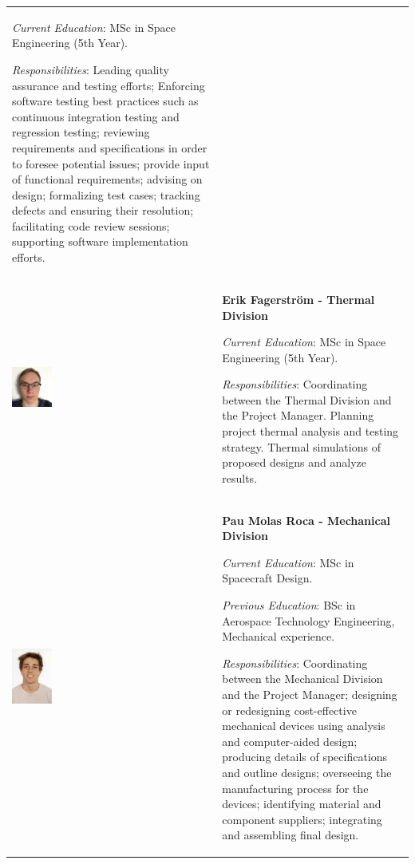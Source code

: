 \begin{longtable}[]{m{} m{}}
\smallskip
\textit{Current Education}: MSc in Space Engineering (5th Year).

\smallskip
\textit{Responsibilities}: Leading quality assurance and testing efforts; Enforcing software testing best practices such as continuous integration testing and regression testing; reviewing requirements and specifications in order to foresee potential issues; provide input of functional requirements; advising on design; formalizing test cases; tracking defects and ensuring their resolution; facilitating code review sessions; supporting software implementation efforts.     
\bigskip
\\


\includegraphics[width=0.2\textwidth]{1-introduction/img/erik-fagerstrom.jpg} & \textbf{Erik Fagerström - Thermal Division}

\smallskip
\textit{Current Education}: MSc in Space Engineering (5th Year).


\smallskip
\textit{Responsibilities}: Coordinating between the Thermal Division and the Project Manager. Planning project thermal analysis and testing strategy. Thermal simulations of proposed designs and analyze results.
\bigskip
\\


\includegraphics[width=0.2\textwidth]{1-introduction/img/pau-molas-roca.jpg} & \textbf{Pau Molas Roca - Mechanical Division}

\smallskip
\textit{Current Education}: MSc in Spacecraft Design.

\smallskip
\textit{Previous Education}: BSc in Aerospace Technology Engineering, Mechanical experience.

\smallskip
\textit{Responsibilities}: Coordinating between the Mechanical Division and the Project Manager; designing or redesigning cost-effective mechanical devices using analysis and computer-aided design; producing details of specifications and outline designs; overseeing the manufacturing process for the devices; identifying material and component suppliers; integrating and assembling final design.   \bigskip
\\



\end{longtable}
